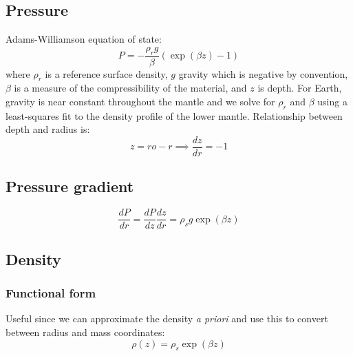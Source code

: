 \documentclass[12pt,notitlepage]{article}
\begin{document}
\subsection{Pressure}
Adams-Williamson equation of state:
\begin{equation}
P = - \frac{\rho_r g}{\beta} (\exp( \beta z )-1)
\end{equation}
where $\rho_r$ is a reference surface density, $g$ gravity which is negative by convention, $\beta$ is a measure of the compressibility of the material, and $z$ is depth.  For Earth, gravity is near constant throughout the mantle and we solve for $\rho_r$ and $\beta$ using a least-squares fit to the density profile of the lower mantle.  Relationship between depth and radius is:
\begin{equation}
z = ro - r \implies \frac{dz}{dr} = -1
\end{equation}
\subsection{Pressure gradient}
\begin{equation}
\frac{dP}{dr} = \frac{dP}{dz} \frac{dz}{dr} = \rho_s g \exp( \beta z )
\end{equation}
\subsection{Density}
\subsubsection{Functional form}
Useful since we can approximate the density \emph{a priori} and use this to convert between radius and mass coordinates:
\begin{equation}
\rho(z) = \rho_s \exp( \beta z )
\end{equation}
\end{document}
